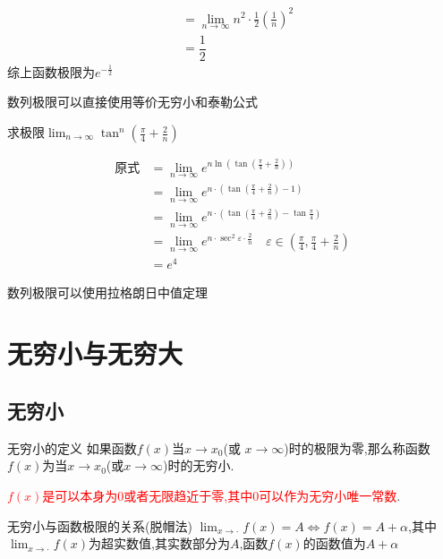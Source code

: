 \documentclass[8pt a4paper, oneside, UTF8]{ctexbook}
\begin{document}
\begin{sloppypar}
\begin{solution}
\begin{align*}
          & = \lim_{n\to\infty}n^2\cdot\frac12\left(\frac1n\right)^2 \\
          &= \dfrac{1}{2}
        \end{align*}
        综上函数极限为$e^{-\frac{1}{2}}$
    \end{solution}
    \begin{note}
        数列极限可以直接使用等价无穷小和泰勒公式
    \end{note}
    \begin{problem}
        求极限$\lim_{n\to\infty}\tan^n\left(\frac\pi4+\frac2n\right)$
    \end{problem}
    \begin{solution}
        \begin{align*}
            \text{原式} & = \lim_{n\to\infty} e^{n \ln(\tan(\frac{\pi}{4}+\frac{2}{n}))}\\
            & =  \lim_{n\to\infty}e^{n\cdot (\tan(\frac{\pi}{4}+\frac{2}{n}) -1)}\\
            & = \lim_{n\to\infty}e^{n\cdot (\tan(\frac{\pi}{4}+\frac{2}{n}) -\tan \frac{\pi}{4})} \\
            & = \lim_{n\to\infty}e^{n \cdot \sec^2 \varepsilon \cdot \frac{2}{n}} \quad \varepsilon \in(\frac{\pi}{4},\frac{\pi}{4}+\frac{2}{n})\\
            &=e^4
        \end{align*}
    \end{solution}
    \begin{note}
        数列极限可以使用拉格朗日中值定理
    \end{note}
    \section{无穷小与无穷大}
    \subsection{无穷小}
    \begin{defn}{无穷小的定义}{}
        如果函数$f(x)$当$x\to x_0$(或 $x\to\infty$)时的极限为零,那么称函数$f(x)$为当$x\to x_0$(或$x\to\infty$)时的无穷小.
    \end{defn}
    \textcolor{red}{$f(x)$是可以本身为$0$或者无限趋近于零,其中$0$可以作为无穷小唯一常数}.
    \begin{criterion}{无穷小与函数极限的关系(脱帽法)}{}
        $\lim_{x\to\cdot}f(x)=A\Leftrightarrow f(x)=A+\alpha$,其中$\lim_{x\to\cdot}f(x)$为超实数值,其实数部分为$A$,函数$f(x)$的函数值为$A+\alpha$\label{wqx1}
    \end{criterion}

\end{sloppypar}
\end{document}
